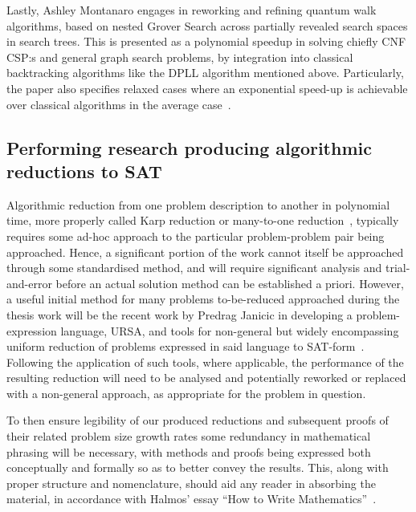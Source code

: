 \documentclass[msc,lith,english]{liuthesis}
\begin{document}

Lastly, Ashley Montanaro engages in reworking and refining quantum walk algorithms, based on nested Grover Search across partially revealed search spaces in search trees. This is presented as a polynomial speedup in solving chiefly CNF CSP:s and general graph search problems, by integration into classical backtracking algorithms like the DPLL algorithm mentioned above. Particularly, the paper also specifies relaxed cases where an exponential speed-up is achievable over classical algorithms in the average case~\cite{QWSBA}.

\subsection{Performing research producing algorithmic reductions to SAT}

Algorithmic reduction from one problem description to another in polynomial time, more properly called Karp reduction or many-to-one reduction~\cite{CCAMA}, typically requires some ad-hoc approach to the particular problem-problem pair being approached. Hence, a significant portion of the work cannot itself be approached through some standardised method, and will require significant analysis and trial-and-error before an actual solution method can be established a priori. However, a useful initial method for many problems to-be-reduced approached during the thesis work will be the recent work by Predrag Janicic in developing a problem-expression language, URSA, and tools for non-general but widely encompassing uniform reduction of problems expressed in said language to SAT-form~\cite{URSA}. Following the application of such tools, where applicable, the performance of the resulting reduction will need to be analysed and potentially reworked or replaced with a non-general approach, as appropriate for the problem in question. 

To then ensure legibility of our produced reductions and subsequent proofs of their related problem size growth rates some redundancy in mathematical phrasing will be necessary, with methods and proofs being expressed both conceptually and formally so as to better convey the results. This, along with proper structure and nomenclature, should aid any reader in absorbing the material, in accordance with Halmos' essay ``How to Write Mathematics''~\cite{HTWM}.
\end{document}
